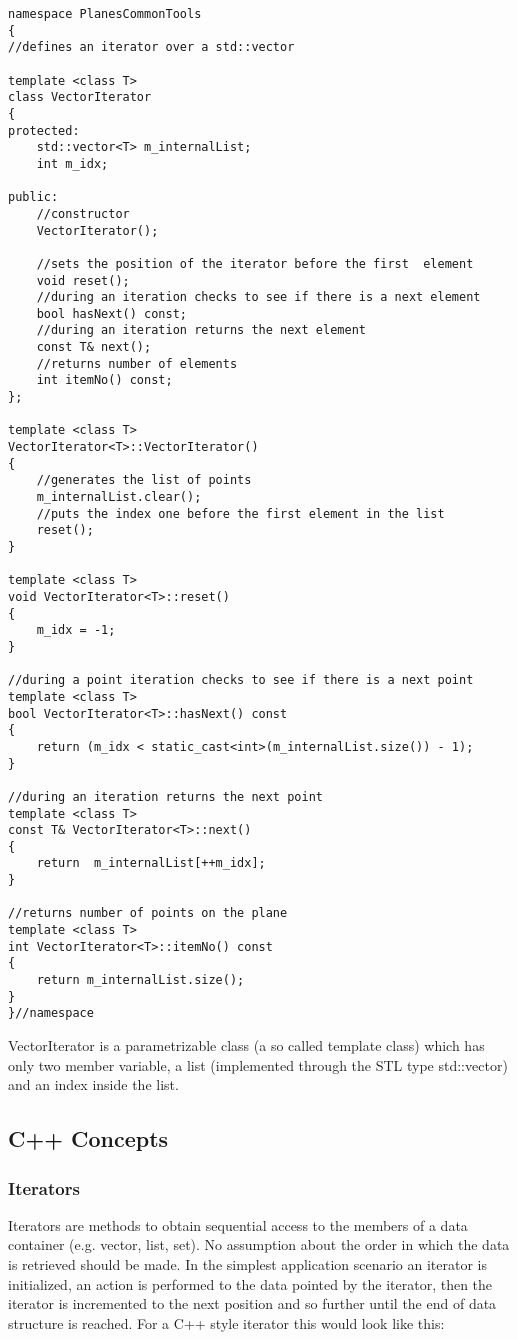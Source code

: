 \begin{lstlisting}
namespace PlanesCommonTools
{
//defines an iterator over a std::vector

template <class T>
class VectorIterator
{
protected:
    std::vector<T> m_internalList;
    int m_idx;

public:
    //constructor
    VectorIterator();

    //sets the position of the iterator before the first  element
    void reset();
    //during an iteration checks to see if there is a next element
    bool hasNext() const;
    //during an iteration returns the next element
    const T& next();
    //returns number of elements
    int itemNo() const;
};

template <class T>
VectorIterator<T>::VectorIterator()
{
    //generates the list of points
    m_internalList.clear();
    //puts the index one before the first element in the list
    reset();
}

template <class T>
void VectorIterator<T>::reset()
{
    m_idx = -1;
}

//during a point iteration checks to see if there is a next point
template <class T>
bool VectorIterator<T>::hasNext() const
{
    return (m_idx < static_cast<int>(m_internalList.size()) - 1);
}

//during an iteration returns the next point
template <class T>
const T& VectorIterator<T>::next()
{
    return  m_internalList[++m_idx];
}

//returns number of points on the plane
template <class T>
int VectorIterator<T>::itemNo() const
{
    return m_internalList.size();
}
}//namespace

\end{lstlisting}

VectorIterator is a parametrizable class (a so called template class) which has only two member variable, a list (implemented through the STL type std::vector) and an index inside the list. 

\subsection {C++ Concepts}
\subsubsection {Iterators}

Iterators are methods to obtain sequential access to the members of a data container (e.g. vector, list, set). No assumption about the order in which the data is retrieved should be made. In the simplest application scenario an iterator is initialized, an action is performed to the data pointed by the iterator, then the iterator is incremented to the next position and so further until the end of data structure is reached. For a C++ style iterator this would look like this:

